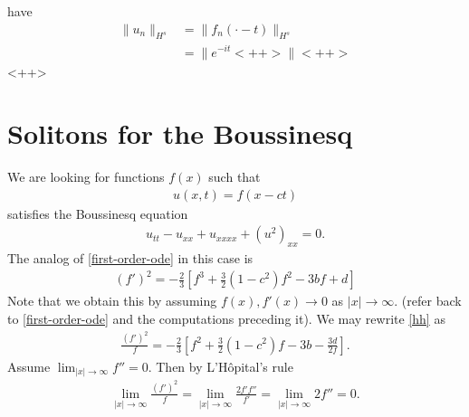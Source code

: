 \documentclass[12pt,reqno]{amsart}
\numberwithin{equation}{section}  %
\begin{document}
have
%
%
\begin{equation}
\begin{split}
  \| u_{n} \|_{H^{s}}
  & = \| f_{n}(\cdot - t) \|_{H^{s}}
  \\
  & = \| e^{-it}<++> \|<++>
\end{split}
\label{<++>}
\end{equation}
%
%
<++>
\label{ssec:boundedness}
%
%
%
%
%
%
%
%
\section{Solitons for the Boussinesq} 
\label{sec:soliton}
We are looking for functions $f(x)$ such that
%
%
\begin{equation}
  \label{ansatz-bous}
\begin{split}
u(x,t) = f(x-ct)
\end{split}
\end{equation}
%
%
satisfies the Boussinesq equation
%
%
\begin{equation}
  \label{bous-eqn*}
\begin{split}
  u_{tt} -u_{xx} + u_{xxxx} + (u^{2})_{xx} = 0.
\end{split}
\end{equation}
%
%
The analog of \eqref{first-order-ode} in this case is
%
%
\begin{equation}
  \label{hh}
\begin{split}
  (f')^{2} = -\frac{2}{3} \left [ f^{3} + \frac{3}{2}(1-c^{2})f^{2} - 3bf +d \right ]
\end{split}
\end{equation}
%
Note that we obtain this by assuming $f(x), f'(x) \to 0$ as $|x| \to \infty$.
(refer back to \eqref{first-order-ode} and the computations preceding it).
We may rewrite \eqref{hh} as
%
%
\begin{equation}
  \label{first-order-rewritten}
\begin{split}
  \frac{(f')^{2}}{f} = -\frac{2}{3}\left[ f^{2} + \frac{3}{2}(1-c^{2})f- 3b -
  \frac{3d}{2f}\right].
\end{split}
\end{equation}
%
%
Assume $\lim_{|x| \to \infty} f'' =0$. Then by L'H\^opital's rule
%
%
\begin{equation*}
\begin{split}
  \lim_{|x| \to \infty} \frac{(f')^{2}}{f} = \lim_{|x| \to \infty} \frac{2f'
  f''}{f'} = \lim_{|x| \to \infty} 2f'' = 0.
\end{split}
\end{equation*}
\end{document}
